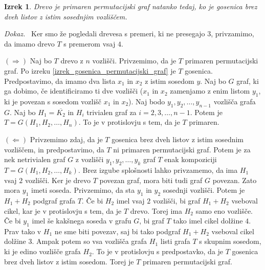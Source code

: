 \documentclass[a4paper, 12pt]{book}
\newtheorem{izrek}{Izrek}[chapter]
\newenvironment{dokaz}{\emph{Dokaz.}\ }{\hspace{\fill}{$\Box$}}
\begin{document}
\begin{izrek}
\label{izrek_primarna_drevesa}
    Drevo je primaren permutacijski graf natanko tedaj, ko je gosenica brez dveh listov z istim sosednjim vozliščem.
\end{izrek}
\begin{dokaz}
    Ker smo že pogledali drevesa s premeri, ki ne presegajo $3$, privzamimo, da imamo drevo $T$ s premerom vsaj $4$. 
    
    $(\Rightarrow)$ Naj bo $T$ drevo z $n$ vozlišči. Privzemimo, da je $T$ primaren permutacijski graf. Po izreku \ref{izrek_gosenica_permutacijski_graf} je $T$ gosenica. Predpostavimo, da imamo dva lista $x_1$ in $x_2$ z istim sosedom $y$. Naj bo $G$ graf, ki ga dobimo, če identificiramo ti dve vozlišči ($x_1$ in $x_2$ zamenjamo z enim listom $y_1$, ki je povezan s sosedom vozlišč $x_1$ in $x_2$). Naj bodo $y_1, y_2, \dots, y_{n-1}$ vozlišča grafa $G$. Naj bo $H_1 = \overline{K_2}$ in $H_i$ trivialen graf za $i = 2, 3, \dots, n-1$. Potem je $T = G(H_1, H_2, \dots, H_n)$. To je v protislovju s tem, da je $T$ primaren. 
    
    $(\Leftarrow)$ Privzemimo zdaj, da je $T$ gosenica brez dveh listov z istim sosednim vozliščem, in predpostavimo, da $T$ ni primaren permutacijski graf. Potem je za nek netrivialen graf $G$ z vozlišči $y_1, y_2, \dots, y_k$ graf $T$ enak kompoziciji $T = G(H_1, H_2, \dots, H_k)$. Brez izgube splošnosti lahko privzamemo, da ima $H_1$ vsaj $2$ vozlišči. Ker je drevo $T$ povezan graf, mora biti tudi graf $G$ povezan. Zato mora $y_1$ imeti soseda. Privzemimo, da sta $y_1$ in $y_2$ sosednji vozlišči. Potem je $H_1 + H_2$ podgraf grafa $T$. Če bi $H_2$ imel vsaj $2$ vozlišči, bi graf $H_1 + H_2$ vseboval cikel, kar je v protislovju s tem, da je $T$ drevo. Torej ima $H_2$ samo eno vozlišče. Če bi $y_1$ imel še kakšnega soseda v grafu $G$, bi graf $T$ tako imel cikel dolžine $4$. Prav tako v $H_1$ ne sme biti povezav, saj bi tako podgraf $H_1 + H_2$ vseboval cikel dolžine $3$. Ampak potem so vsa vozlišča grafa $H_1$ listi grafa $T$ s skupnim sosedom, ki je edino vozlišče grafa $H_2$. To je v protislovju s predpostavko, da je $T$ gosenica brez dveh listov z istim sosedom. Torej je $T$ primaren permutacijski graf.
\end{dokaz}
\end{document}
